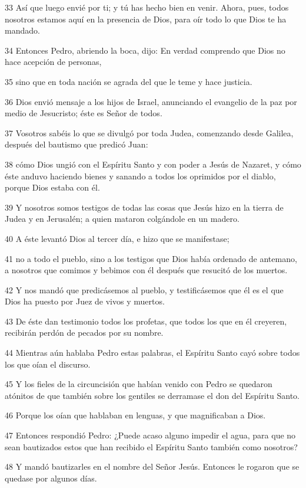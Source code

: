 \par 33 Así que luego envié por ti; y tú has hecho bien en venir. Ahora, pues, todos nosotros estamos aquí en la presencia de Dios, para oír todo lo que Dios te ha mandado.
\par 34 Entonces Pedro, abriendo la boca, dijo: En verdad comprendo que Dios no hace acepción de personas,
\par 35 sino que en toda nación se agrada del que le teme y hace justicia.
\par 36 Dios envió mensaje a los hijos de Israel, anunciando el evangelio de la paz por medio de Jesucristo; éste es Señor de todos.
\par 37 Vosotros sabéis lo que se divulgó por toda Judea, comenzando desde Galilea, después del bautismo que predicó Juan:
\par 38 cómo Dios ungió con el Espíritu Santo y con poder a Jesús de Nazaret, y cómo éste anduvo haciendo bienes y sanando a todos los oprimidos por el diablo, porque Dios estaba con él.
\par 39 Y nosotros somos testigos de todas las cosas que Jesús hizo en la tierra de Judea y en Jerusalén; a quien mataron colgándole en un madero.
\par 40 A éste levantó Dios al tercer día, e hizo que se manifestase;
\par 41 no a todo el pueblo, sino a los testigos que Dios había ordenado de antemano, a nosotros que comimos y bebimos con él después que resucitó de los muertos.
\par 42 Y nos mandó que predicásemos al pueblo, y testificásemos que él es el que Dios ha puesto por Juez de vivos y muertos.
\par 43 De éste dan testimonio todos los profetas, que todos los que en él creyeren, recibirán perdón de pecados por su nombre.
\par 44 Mientras aún hablaba Pedro estas palabras, el Espíritu Santo cayó sobre todos los que oían el discurso.
\par 45 Y los fieles de la circuncisión que habían venido con Pedro se quedaron atónitos de que también sobre los gentiles se derramase el don del Espíritu Santo.
\par 46 Porque los oían que hablaban en lenguas, y que magnificaban a Dios.
\par 47 Entonces respondió Pedro: ¿Puede acaso alguno impedir el agua, para que no sean bautizados estos que han recibido el Espíritu Santo también como nosotros?
\par 48 Y mandó bautizarles en el nombre del Señor Jesús. Entonces le rogaron que se quedase por algunos días.

